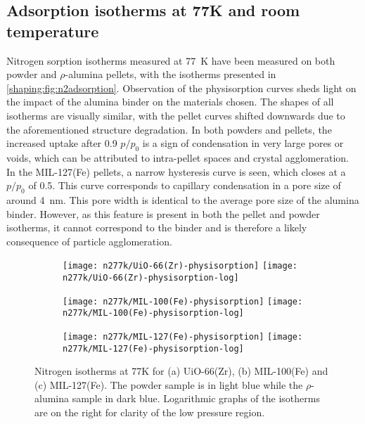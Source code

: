 
\subsection{Adsorption isotherms at 77K and room temperature}

Nitrogen sorption isotherms measured at \SI{77}{\kelvin} have been
measured on both powder and \(\rho\)-alumina pellets, with the isotherms
presented in \autoref{shaping:fig:n2adsorption}.
Observation of the physisorption curves sheds light on the
impact of the alumina binder on the materials chosen.
The shapes of all isotherms are visually similar, with the pellet curves
shifted downwards due to the aforementioned structure degradation.
In both powders and pellets, the increased uptake after 0.9 \(p/p_0\)
is a sign of condensation in very large pores or voids, which can
be attributed to intra-pellet spaces and crystal agglomeration.
In the MIL-127(Fe) pellets, a narrow hysteresis curve is seen,
which closes at a \(p/p_0\) of 0.5. This curve corresponds to
capillary condensation in a pore size of around \SI{4}{\nano\metre}.
This pore width is identical to the average pore size of the alumina
binder. However, as this feature is present in both the pellet and 
powder isotherms, it cannot correspond to the binder and is therefore
a likely consequence of particle agglomeration.

\begin{figure}[p!]
	\centering

	\begin{subfigure}{\linewidth}
		\centering
		\parbox[c]{0.1\linewidth}{\caption{}\label{shaping:fig:n277kuio66}}%
		\texttt{[image: n277k/UiO-66(Zr)-physisorption]}%
		\texttt{[image: n277k/UiO-66(Zr)-physisorption-log]}%
	\end{subfigure}%

	\begin{subfigure}{\linewidth}
		\centering
		\parbox[c]{0.1\linewidth}{\caption{}\label{shaping:fig:n277kmil100}}%
		\texttt{[image: n277k/MIL-100(Fe)-physisorption]}%
		\texttt{[image: n277k/MIL-100(Fe)-physisorption-log]}%
	\end{subfigure}%

	\begin{subfigure}{\linewidth}
		\centering
		\parbox[c]{0.1\linewidth}{\caption{}\label{shaping:fig:n277kmil127}}%
		\texttt{[image: n277k/MIL-127(Fe)-physisorption]}%
		\texttt{[image: n277k/MIL-127(Fe)-physisorption-log]}%
	\end{subfigure}%

	\caption{Nitrogen isotherms at 77K for (a) UiO-66(Zr),
		(b) MIL-100(Fe) and (c) MIL-127(Fe). The powder sample is in light
		blue while the \(\rho\)-alumina sample in dark blue. Logarithmic
		graphs of the isotherms are on the right for clarity of the low
		pressure region.}%
	\label{shaping:fig:n2adsorption}
\end{figure}

